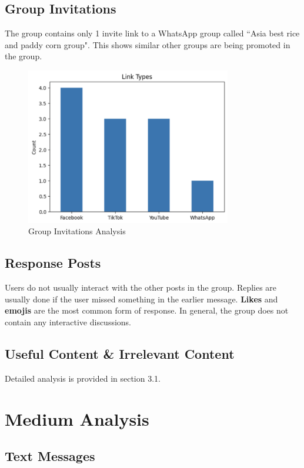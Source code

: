 \documentclass[12pt]{article}
\begin{document}
\subsection{Group Invitations}
The group contains only 1 invite link to a WhatsApp group called ``Asia best rice and paddy corn group". This shows similar other groups are being promoted in the group.
\begin{figure}[H]
\centering
\includegraphics[width=0.8\textwidth]{img/group_invitations.png}
\caption{Group Invitations Analysis}
\end{figure}

\subsection{Response Posts}
Users do not usually interact with the other posts in the group. Replies are usually done if the user missed something in the earlier message.  \textbf{Likes} and \textbf{emojis} are the most common form of response. In general, the group does not contain any interactive discussions.



\subsection{Useful Content \& Irrelevant Content}
Detailed analysis is provided in section 3.1.

\section{Medium Analysis}
\subsection{Text Messages}
\end{document}
